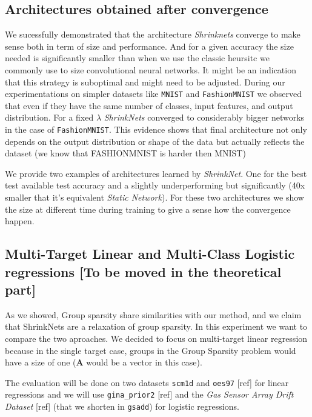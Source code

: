 \subsection{Architectures obtained after convergence}

We sucessfully demonstrated that the architecture \textit{Shrinknets} converge
to make sense both in term of size and performance. And for a given accuracy the
size needed is significantly smaller than when we use the classic heursitc we
commonly use to size convolutional neural networks. It might be an indication
that this strategy is suboptimal and might need to be adjusted. During our
experimentations on simpler datasets like \texttt{MNIST} and
\texttt{FashionMNIST} we observed that even if they have the same number of
classes, input features, and output distribution. For a fixed $\lambda$
\textit{ShrinkNets} converged to considerably bigger networks in the case of
\texttt{FashionMNIST}. This evidence shows that final architecture not only
depends on the output distribution or shape of the data but actually reflects
the dataset (we know that FASHIONMNIST is harder then MNIST)

We provide two examples of architectures learned by \textit{ShrinkNet}. One
for the best test available test accuracy and a slightly underperforming but
significantly (40x smaller that it's equivalent \textit{Static Network}). For
these two architectures we show the size at different time during training to
give a sense how the convergence happen.


\subsection{Multi-Target Linear and Multi-Class Logistic regressions [To be
  moved in the theoretical part]}

As we showed, Group sparsity share similarities with our method, and we claim
that ShrinkNets are a relaxation of group sparsity.  In this experiment we want
to compare the two aproaches.  We decided to focus on multi-target linear
regression because in the single target case, groups in the Group Sparsity
problem would have a size of one ($\bm{A}$ would be a vector in this case).

The evaluation will be done on two datasets \texttt{scm1d} and \texttt{oes97}
[ref] for linear regressions and we will use \texttt{gina\_prior2} [ref] and
the \textit{Gas Sensor Array Drift Dataset} [ref] (that we shorten in
\texttt{gsadd}) for logistic regressions.

